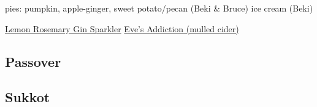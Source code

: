pies: pumpkin, apple-ginger, sweet potato/pecan (Beki \& Bruce)
ice cream (Beki)

\href{https://www.seriouseats.com/recipes/2014/11/gin-cocktail-for-crowds-charred-lemon-rosemary-drink-recipe.html}{Lemon Rosemary Gin Sparkler}
\href{https://www.seriouseats.com/recipes/2013/11/eves-addiction-hot-mulled-cider-recipe.html}{Eve's Addiction (mulled cider)}
\subsection{Passover}

\subsection{Sukkot}
